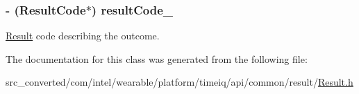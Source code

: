\subsubsection[{result\+Code\+\_\+}]{\setlength{\rightskip}{0pt plus 5cm}-\/ ({\bf Result\+Code}$\ast$) result\+Code\+\_\+}\label{interface_result_ac9012dcb96277da30fa131abdcecd808}


\hyperlink{interface_result}{Result} code describing the outcome. 



The documentation for this class was generated from the following file\+:\begin{DoxyCompactItemize}
\item 
src\+\_\+converted/com/intel/wearable/platform/timeiq/api/common/result/\hyperlink{_result_8h}{Result.\+h}\end{DoxyCompactItemize}
